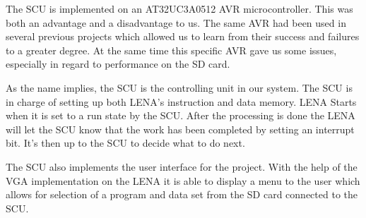 The \acf{SCU} is implemented on an AT32UC3A0512 AVR microcontroller. This was both an advantage and a disadvantage to us. The same AVR had been used in several previous projects which allowed us to learn from their success and failures to a greater degree. At the same time this specific AVR gave us some issues, especially in regard to performance on the \ac{SD} card.

As the name implies, the \ac{SCU} is the controlling unit in
our system. The \ac{SCU} is in charge of setting up both \ac{LENA}'s instruction
and data memory. \ac{LENA} Starts when it is set to a run state by the
\ac{SCU}. After the processing is done the \ac{LENA} will let the \ac{SCU} know
that the work has been completed by setting an interrupt bit. It's then up to
the \ac{SCU} to decide what to do next.

The \ac{SCU} also implements the user interface for the project. With the help
of the \ac{VGA} implementation on the \ac{LENA} it is able to display a menu to
the user which allows for selection of a program and data set from the \ac{SD}
card connected to the \ac{SCU}.
